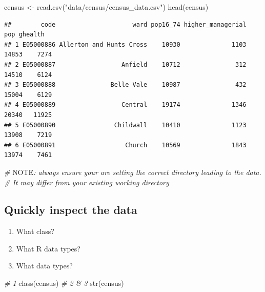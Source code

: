 \documentclass[
]{book}
\newenvironment{Shaded}{\begin{snugshade}}{\end{snugshade}}
\newcommand{\AlertTok}[1]{\textcolor[rgb]{0.94,0.16,0.16}{#1}}
\newcommand{\CommentTok}[1]{\textcolor[rgb]{0.56,0.35,0.01}{\textit{#1}}}
\newcommand{\FunctionTok}[1]{\textcolor[rgb]{0.00,0.00,0.00}{#1}}
\newcommand{\NormalTok}[1]{#1}
\newcommand{\OtherTok}[1]{\textcolor[rgb]{0.56,0.35,0.01}{#1}}
\newcommand{\StringTok}[1]{\textcolor[rgb]{0.31,0.60,0.02}{#1}}
\begin{document}
\begin{Shaded}
\begin{Highlighting}[]
\NormalTok{census }\OtherTok{\textless{}{-}} \FunctionTok{read.csv}\NormalTok{(}\StringTok{"data/census/census\_data.csv"}\NormalTok{)}
\FunctionTok{head}\NormalTok{(census)}
\end{Highlighting}
\end{Shaded}

\begin{verbatim}
##        code                     ward pop16_74 higher_managerial   pop ghealth
## 1 E05000886 Allerton and Hunts Cross    10930              1103 14853    7274
## 2 E05000887                  Anfield    10712               312 14510    6124
## 3 E05000888               Belle Vale    10987               432 15004    6129
## 4 E05000889                  Central    19174              1346 20340   11925
## 5 E05000890                Childwall    10410              1123 13908    7219
## 6 E05000891                   Church    10569              1843 13974    7461
\end{verbatim}

\begin{Shaded}
\begin{Highlighting}[]
\CommentTok{\# }\AlertTok{NOTE}\CommentTok{: always ensure your are setting the correct directory leading to the data. }
\CommentTok{\# It may differ from your existing working directory}
\end{Highlighting}
\end{Shaded}

\hypertarget{quickly-inspect-the-data}{%
\subsection{Quickly inspect the data}\label{quickly-inspect-the-data}}

\begin{enumerate}
\def\labelenumi{\arabic{enumi}.}
\item
  What class?
\item
  What R data types?
\item
  What data types?
\end{enumerate}

\begin{Shaded}
\begin{Highlighting}[]
\CommentTok{\# 1}
\FunctionTok{class}\NormalTok{(census)}
\CommentTok{\# 2 \& 3}
\FunctionTok{str}\NormalTok{(census)}
\end{Highlighting}
\end{Shaded}
\end{document}
